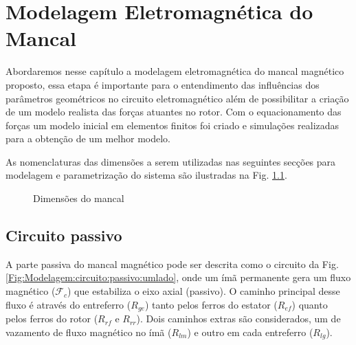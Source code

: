 \pagestyle{empty}
\cleardoublepage
\pagestyle{fancy}

\chapter{Modelagem Eletromagnética do Mancal}

%


Abordaremos nesse capítulo a modelagem eletromagnética do mancal magnético proposto, essa etapa é importante para o entendimento das influências dos parâmetros geométricos no circuito eletromagnético além de possibilitar a criação de um modelo realista das forças atuantes no rotor. Com o equacionamento das forças um modelo inicial em elementos finitos foi criado e simulações realizadas para a obtenção de um melhor modelo. 

As nomenclaturas das dimensões a serem utilizadas nas seguintes secções para modelagem e parametrização do sistema são ilustradas na Fig. \ref{Fig:Modelagem:Dimensoes}.




\begin{figure}[!ht]
	\centering
	\def\svgwidth{\columnwidth}
	
		\caption{Dimensões do mancal}
		\label{Fig:Modelagem:Dimensoes}
\end{figure} 

\section{Circuito passivo}

A parte passiva do mancal magnético pode ser descrita como o circuito da Fig. \ref{Fig:Modelagem:circuito:passivo:umlado}, onde um ímã permanente gera um fluxo magnético ($\mathcal{F}_c$) que estabiliza o eixo axial (passivo). O caminho principal desse fluxo é através do entreferro ($R_{ge}$) tanto pelos ferros do estator ($R_{ef}$) quanto pelos ferros do rotor ($R_{rf}$ e $R_{rr}$). Dois caminhos extras são considerados, um de vazamento de fluxo magnético no ímã ($R_{lm}$) e outro em cada entreferro ($R_{lg}$). 


